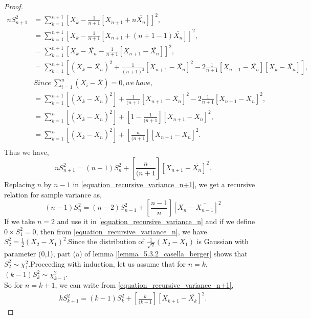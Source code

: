 \documentclass[a4paper,english,12pt]{article}
\begin{document}
\begin{proof}
\begin{align}
nS_{n+1} ^2& =\sum\limits_{k=1}^{n+1} [X_{k}-\frac{1}{n+1} [X_{n+1} + n\overline{X_n}]]^2 , \nonumber \\
& =\sum\limits_{k=1}^{n+1} [X_{k}-\frac{1}{n+1} [X_{n+1} + (n+1-1)\overline{X_n}]]^2 , \nonumber \\
& =\sum\limits_{k=1}^{n+1} [X_{k}-\overline{X_n}-\frac{1}{n+1}[X_{n+1} - \overline{X_n}]]^2 , \nonumber \\
& =\sum\limits_{k=1}^{n+1} [(X_{k}-\overline{X_n})^2+\frac{1}{(n+1)^2}[X_{n+1} - \overline{X_n}]^2-2 \frac{1}{n+1}[X_{n+1} - \overline{X_n}][X_{k}-\overline{X_n}]] , \nonumber \\
& Since~\sum_{i=1}^n(X_i-\overline{X})=0,we~have, \nonumber \\
& =\sum\limits_{k=1}^{n+1} [(X_{k}-\overline{X_n})^2]+\frac{1}{(n+1}[X_{n+1} - \overline{X_n}]^2-2 \frac{1}{n+1}[X_{n+1} - \overline{X_n}]^2 , \nonumber \\
& =\sum\limits_{k=1}^{n} [(X_{k}-\overline{X_n})^2]+[1-\frac{1}{(n+1}][X_{n+1} - \overline{X_n}]^2 , \nonumber \\
& =\sum\limits_{k=1}^{n} [(X_{k}-\overline{X_n})^2]+[\frac{n}{(n+1}][X_{n+1} - \overline{X_n}]^2 . \nonumber \\
\end{align}
Thus we have,
\begin{equation} \label{equation_recursive_variance_n+1}
nS_{n+1} ^2=(n-1)S_{n} ^2+[\frac{n}{(n+1}][X_{n+1} - \overline{X_n}]^2.
\end{equation}
Replacing $n$ by $n-1$ in \eqref{equation_recursive_variance_n+1}, we get a recursive relation for sample variance as,
\begin{equation} \label{equation_recursive_variance_n}
(n-1)S_{n} ^2=(n-2)S_{n-1} ^2+[\frac{n-1}{n}][X_{n} - \overline{X_{n-1}}]^2
\end{equation} 
If we take $n=2$ and use it in \eqref{equation_recursive_variance_n} and if we define $0\times S_1 ^2=0$, then from \eqref{equation_recursive_variance_n}, we have $S_2^2=\frac{1}{2}(X_2-X_1)^2$.Since the distribution of $\frac{1}{\sqrt{2}}(X_2-X_1)$ is Gaussian with parameter (0,1), part (a) of lemma  \ref{lemma_5.3.2_casella_berger} shows that $S_2 ^2 \sim \chi_1 ^2$.Proceeding with induction, let us assume that for $n=k$, $(k-1)S_k ^2 \sim \chi_{k-1} ^2$.\\
So for $n=k+1$, we can write from \eqref{equation_recursive_variance_n+1},
\begin{align}
kS_{k+1} ^2=(k-1)S_{k} ^2+[\frac{k}{(k+1}][X_{k+1} - \overline{X_k}]^2.

\end{align}
\end{proof}
\end{document}
